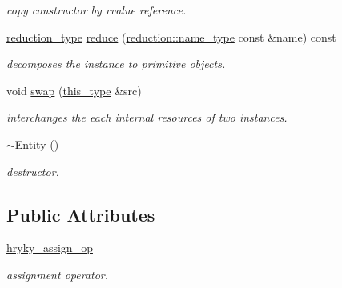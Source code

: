 \begin{DoxyCompactItemize}
\begin{DoxyCompactList}\small\item\em copy constructor by rvalue reference. \end{DoxyCompactList}\item 
\hypertarget{classhryky_1_1http_1_1_entity_a26762cbd1f41f76053dd5aa9a14605d2}{\hyperlink{namespacehryky_a343a9a4c36a586be5c2693156200eadc}{reduction\-\_\-type} \hyperlink{classhryky_1_1http_1_1_entity_a26762cbd1f41f76053dd5aa9a14605d2}{reduce} (\hyperlink{namespacehryky_1_1reduction_ac686c30a4c8d196bbd0f05629a6b921f}{reduction\-::name\-\_\-type} const \&name) const }\label{classhryky_1_1http_1_1_entity_a26762cbd1f41f76053dd5aa9a14605d2}

\begin{DoxyCompactList}\small\item\em decomposes the instance to primitive objects. \end{DoxyCompactList}\item 
\hypertarget{classhryky_1_1http_1_1_entity_a9b87d22f99398a3754c3087202969c3f}{void \hyperlink{classhryky_1_1http_1_1_entity_a9b87d22f99398a3754c3087202969c3f}{swap} (\hyperlink{classhryky_1_1http_1_1_entity_a4afcdfef1cb6784f4dca15a9379e507f}{this\-\_\-type} \&src)}\label{classhryky_1_1http_1_1_entity_a9b87d22f99398a3754c3087202969c3f}

\begin{DoxyCompactList}\small\item\em interchanges the each internal resources of two instances. \end{DoxyCompactList}\item 
\hypertarget{classhryky_1_1http_1_1_entity_ad2c0b249a677a567d58eeb6dfc4f70e2}{\hyperlink{classhryky_1_1http_1_1_entity_ad2c0b249a677a567d58eeb6dfc4f70e2}{$\sim$\-Entity} ()}\label{classhryky_1_1http_1_1_entity_ad2c0b249a677a567d58eeb6dfc4f70e2}

\begin{DoxyCompactList}\small\item\em destructor. \end{DoxyCompactList}\end{DoxyCompactItemize}
\subsection*{Public Attributes}
\begin{DoxyCompactItemize}
\item 
\hypertarget{classhryky_1_1http_1_1_entity_a955969f57e5993834f98157253cf0268}{\hyperlink{classhryky_1_1http_1_1_entity_a955969f57e5993834f98157253cf0268}{hryky\-\_\-assign\-\_\-op}}\label{classhryky_1_1http_1_1_entity_a955969f57e5993834f98157253cf0268}

\begin{DoxyCompactList}\small\item\em assignment operator. \end{DoxyCompactList}\end{DoxyCompactItemize}


